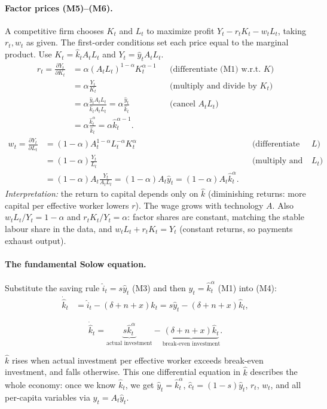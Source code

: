 \paragraph{Factor prices (M5)--(M6).} A competitive firm chooses $K_t$ and $L_t$ to maximize profit $Y_t - r_tK_t - w_tL_t$, taking $r_t,w_t$ as given. The first-order conditions set each price equal to the marginal product. Use $K_t=\hat k_t A_tL_t$ and $Y_t = \hat y_tA_tL_t$.
\begin{align*}
r_t = \frac{\partial Y_t}{\partial K_t} &= \alpha(A_tL_t)^{1-\alpha}K_t^{\alpha-1} && \text{(differentiate (M1) w.r.t.\ $K$)}\\
&= \alpha\frac{Y_t}{K_t} && \text{(multiply and divide by $K_t$)}\\
&= \alpha\frac{\hat y_tA_tL_t}{\hat k_tA_tL_t} = \alpha\frac{\hat y_t}{\hat k_t} && \text{(cancel $A_tL_t$)}\\
&= \alpha\frac{\hat k_t^{\alpha}}{\hat k_t} = \alpha\hat k_t^{\alpha-1}.
\end{align*}
\begin{align*}
w_t = \frac{\partial Y_t}{\partial L_t} &= (1-\alpha)A_t^{1-\alpha}L_t^{-\alpha}K_t^{\alpha} && \text{(differentiate (M1) w.r.t.\ $L$)}\\
&= (1-\alpha)\frac{Y_t}{L_t} && \text{(multiply and divide by $L_t$)}\\
&= (1-\alpha)A_t\frac{Y_t}{A_tL_t} = (1-\alpha)A_t\hat y_t = (1-\alpha)A_t\hat k_t^{\alpha}.
\end{align*}
\textit{Interpretation:} the return to capital depends only on $\hat k$ (diminishing returns: more capital per effective worker lowers $r$). The wage grows with technology $A$. Also $w_tL_t/Y_t = 1-\alpha$ and $r_tK_t/Y_t=\alpha$: factor shares are constant, matching the stable labour share in the data, and $w_tL_t+r_tK_t=Y_t$ (constant returns, so payments exhaust output).

\paragraph{The fundamental Solow equation.} Substitute the saving rule $\hat i_t=s\hat y_t$ (M3) and then $\hat y_t=\hat k_t^{\alpha}$ (M1) into (M4):
\begin{align*}
\dot{\hat k}_t &= \hat i_t-(\delta+n+x)\hat k_t = s\hat y_t-(\delta+n+x)\hat k_t ,
\end{align*}
\begin{keybox}[title=Fundamental equation of the Solow model]
\begin{equation}\label{eq:sol-fund}
\dot{\hat k}_t = \underbrace{s\hat k_t^{\alpha}}_{\text{actual investment}}-\underbrace{(\delta+n+x)\hat k_t}_{\text{break-even investment}} .
\end{equation}
\end{keybox}
$\hat k$ rises when actual investment per effective worker exceeds break-even investment, and falls otherwise. This one differential equation in $\hat k$ describes the whole economy: once we know $\hat k_t$, we get $\hat y_t=\hat k_t^\alpha$, $\hat c_t=(1-s)\hat y_t$, $r_t$, $w_t$, and all per-capita variables via $y_t=A_t\hat y_t$.

